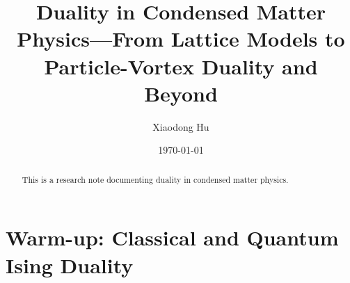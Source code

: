 \documentclass[10pt,nofootinbib]{revtex4}
\numberwithin{equation}{section}
\begin{document}
\title{Duality in Condensed Matter Physics---From Lattice Models to Particle-Vortex Duality and Beyond}%

\author{Xiaodong Hu}

\date{\today}


\begin{abstract}
	This is a research note documenting duality in condensed matter physics.
\end{abstract}
\maketitle
\tableofcontents
\section{Warm-up: Classical and Quantum Ising Duality}
\end{document}
